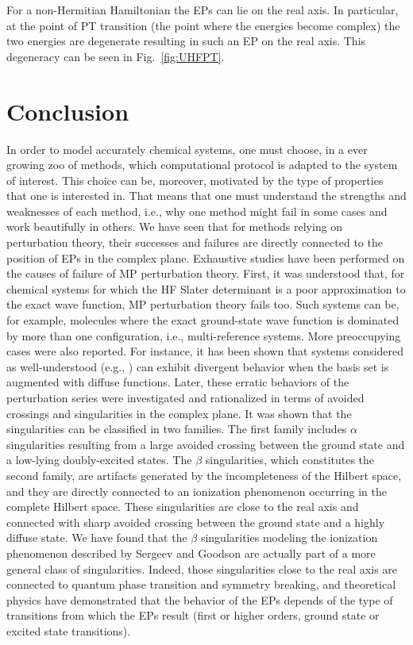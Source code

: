\documentclass[11pt,a4paper]{article}
\begin{document}
For a non-Hermitian Hamiltonian the EPs can lie on the real axis. In particular, at the point of PT transition (the point where the energies become complex) the two energies are degenerate resulting in such an EP on the real axis. This degeneracy can be seen in Fig.~\ref{fig:UHFPT}.

\section{Conclusion}

In order to model accurately chemical systems, one must choose, in a ever growing zoo of methods, which computational protocol is adapted to the system of interest.
This choice can be, moreover, motivated by the type of properties that one is interested in.
That means that one must understand the strengths and weaknesses of each method, i.e., why one method might fail in some cases and work beautifully in others. 
We have seen that for methods relying on perturbation theory, their successes and failures are directly connected to the position of EPs in the complex plane. 
Exhaustive studies have been performed on the causes of failure of MP perturbation theory. 
First, it was understood that, for chemical systems for which the HF Slater determinant is a poor approximation to the exact wave function, MP perturbation theory fails too. Such systems can be, for example, molecules where the exact ground-state wave function is dominated by more than one configuration, i.e., multi-reference systems. 
More preoccupying cases were also reported. 
For instance, it has been shown that systems considered as well-understood (e.g., ) can exhibit divergent behavior when the basis set is augmented with diffuse functions. 
Later, these erratic behaviors of the perturbation series were investigated and rationalized in terms of avoided crossings and singularities in the complex plane. It was shown that the singularities can be classified in two families. 
The first family includes $\alpha$ singularities resulting from a large avoided crossing between the ground state and a low-lying doubly-excited states. 
The $\beta$ singularities, which constitutes the second family, are artifacts generated by the incompleteness of the Hilbert space, and they are directly connected to an ionization phenomenon occurring in the complete Hilbert space. 
These singularities are close to the real axis and connected with sharp avoided crossing between the ground state and a highly diffuse state. 
We have found that the $\beta$ singularities modeling the ionization phenomenon described by Sergeev and Goodson are actually part of a more general class of singularities. Indeed, those singularities close to the real axis are connected to quantum phase transition and symmetry breaking, and theoretical physics have demonstrated that the behavior of the EPs depends of the type of transitions from which the EPs result (first or higher orders, ground state or excited state transitions).
\end{document}
